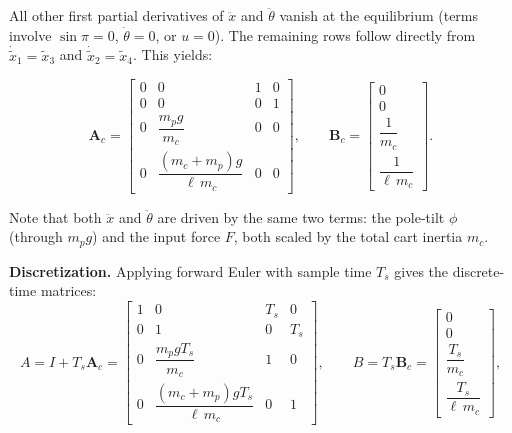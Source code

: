 All other first partial derivatives of $\ddot{x}$ and $\ddot\theta$ vanish at the equilibrium (terms involve $\sin\pi=0$, $\dot\theta=0$, or $u=0$). The remaining rows follow directly from $\dot{\tilde{x}}_1 = \tilde{x}_3$ and $\dot{\tilde{x}}_2 = \tilde{x}_4$. This yields:

\begin{equation}
    \boldsymbol{A}_c = \begin{bmatrix}
        0 & 0 & 1 & 0 \\
        0 & 0 & 0 & 1 \\
        0 & \dfrac{m_p g}{m_c} & 0 & 0 \\[6pt]
        0 & \dfrac{(m_c+m_p)g}{\ell\, m_c} & 0 & 0
    \end{bmatrix}, \qquad
    \boldsymbol{B}_c = \begin{bmatrix}
        0 \\[2pt] 0 \\[2pt]
        \dfrac{1}{m_c} \\[6pt]
        \dfrac{1}{\ell\, m_c}
    \end{bmatrix}.
\end{equation}

Note that both $\ddot{x}$ and $\ddot\theta$ are driven by the same two terms: the pole-tilt $\phi$ (through $m_p g$) and the input force $F$, both scaled by the total cart inertia $m_c$.

\textbf{Discretization.} Applying forward Euler with sample time $T_s$ gives the discrete-time matrices:
\begin{equation}
    A = I + T_s \boldsymbol{A}_c
    = \begin{bmatrix}
        1 & 0 & T_s & 0 \\
        0 & 1 & 0 & T_s \\
        0 & \dfrac{m_p g T_s}{m_c} & 1 & 0 \\[6pt]
        0 & \dfrac{(m_c+m_p)g T_s}{\ell\,m_c} & 0 & 1
    \end{bmatrix}, \qquad
    B = T_s \boldsymbol{B}_c
    = \begin{bmatrix}
        0 \\[2pt] 0 \\[2pt]
        \dfrac{T_s}{m_c} \\[6pt]
        \dfrac{T_s}{\ell\,m_c}
    \end{bmatrix},
\end{equation}

